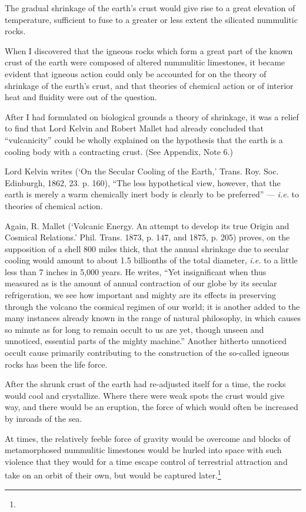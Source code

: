 \documentclass[a4paper, 12pt, oneside]{article}
\begin{document}
The gradual shrinkage of the earth's crust would give rise to a great elevation of temperature, sufficient to fuse to a greater or less extent the silicated nummulitic rocks.

When I discovered that the igneous rocks which form a great part of the known crust of the earth were composed of altered nummulitic limestones, it became evident that igneous action could only be accounted for on the theory of shrinkage of the earth's crust, and that theories of chemical action or of interior heat and fluidity were out of the question.

After I had formulated on biological grounds a theory of shrinkage, it was a relief to find that Lord Kelvin and Robert Mallet had already concluded that ``vulcanicity'' could be wholly explained on the hypothesis that the earth is a cooling body with a contracting crust. (See Appendix, Note 6.)

Lord Kelvin writes (`On the Secular Cooling of the Earth,' Trans. Roy. Soc. Edinburgh, 1862, 23. p. 160), ``The less hypothetical view, however, that the earth is merely a warm chemically inert body is clearly to be preferred'' --- \emph{i.e.} to theories of chemical action.

Again, R. Mallet (`Volcanic Energy. An attempt to develop its true Origin and Cosmical Relations.' Phil. Trans. 1873, p. 147, and 1875, p. 205) proves, on the supposition of a shell 800 miles thick, that the annual shrinkage due to secular cooling would amount to about 1.5 billionths of the total diameter, \emph{i.e.} to a little less than 7 inches in 5,000 years. He writes, ``Yet insignificant when thus measured as is the amount of annual contraction of our globe by its secular refrigeration, we see how important and mighty are its effects in preserving through the volcano the cosmical regimen of our world; it is another added to the many instances already known in the range of natural philosophy, in which causes so minute as for long to remain occult to us are yet, though unseen and unnoticed, essential parts of the mighty machine.'' Another hitherto unnoticed occult cause primarily contributing to the construction of the so-called igneous rocks has been the life force.

After the shrunk crust of the earth had re-adjusted itself for a time, the rocks would cool and crystallize. Where there were weak spots the crust would give way, and there would be an eruption, the force of which would often be increased by inroads of the sea.

At times, the relatively feeble force of gravity would be overcome and blocks of metamorphosed nummulitic limestones would be hurled into space with such violence that they would for a time escape control of terrestrial attraction and take on an orbit of their own, but would be captured later.\footnote{}
\end{document}

